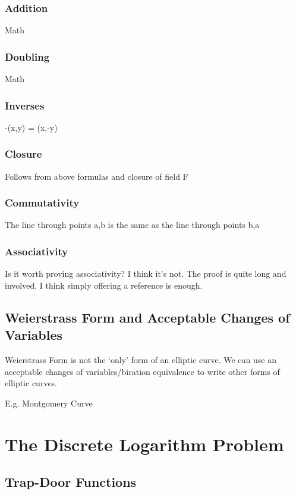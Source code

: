 \documentclass{article}
\begin{document}
\subsubsection{Addition}
Math

\subsubsection{Doubling}
Math

\subsubsection{Inverses}
-(x,y) = (x,-y)

\subsubsection{Closure}
Follows from above formulas and closure of field F

\subsubsection{Commutativity}
The line through points a,b is the same as the line through points b,a

\subsubsection{Associativity}
Is it worth proving associativity? I think it's not. The proof is quite long and involved. I think simply offering a reference is enough.

\subsection{Weierstrass Form and Acceptable Changes of Variables}
Weierstrass Form is not the `only' form of an elliptic curve. We can use an acceptable changes of variables/biration equivalence to write other forms of elliptic curves.

E.g. Montgomery Curve

\clearpage

\section{The Discrete Logarithm Problem}

\subsection{Trap-Door Functions}
\end{document}
